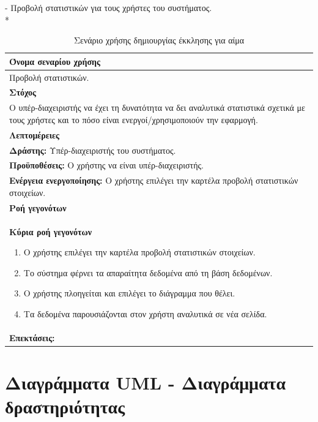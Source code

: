 \newpage
- Προβολή στατιστικών για τους χρήστες του συστήματος.
\\*		
\begin{table}[H]
	\begin{center}
	    \begin{tabular}{|p{\dimexpr \linewidth-2\tabcolsep}|}
	    \hline
	    \rowcolor{grayy}
	    \textbf{Όνομα σεναρίου χρήσης}
	    \\ \hline    
	    Προβολή στατιστικών.
	     \\ \hline
	    \rowcolor{grayy}
	    \textbf{\textbf{Στόχος}}
	    \\ \hline
	 	 Ο υπέρ-διαχειριστής να έχει τη δυνατότητα να δει αναλυτικά στατιστικά σχετικά με τους χρήστες και το πόσο είναι ενεργοί/χρησιμοποιούν την εφαρμογή. 
	    \\ \hline
	    \rowcolor{grayy}
	    \textbf{Λεπτομέρειες}
	    \\ \hline
		\textbf{Δράστης:} Υπέρ-διαχειριστής του συστήματος.
		\\*
		\textbf{Προϋποθέσεις:} Ο χρήστης να είναι υπέρ-διαχειριστής.
		\\*
		\textbf{Ενέργεια ενεργοποίησης:} Ο χρήστης επιλέγει την καρτέλα προβολή στατιστικών στοιχείων.
		\\ \hline
		\rowcolor{grayy}    
	    \textbf{Ροή γεγονότων}
	    \\ \hline
		\textbf{Κύρια ροή γεγονότων}
		\begin{enumerate}
		\item	 Ο χρήστης επιλέγει την καρτέλα προβολή στατιστικών στοιχείων.
		\item Το σύστημα φέρνει τα απαραίτητα δεδομένα από τη βάση δεδομένων.
		\item Ο χρήστης πλοηγείται και επιλέγει το διάγραμμα που θέλει.
		\item Τα δεδομένα παρουσιάζονται στον χρήστη αναλυτικά  σε νέα σελίδα.
		\end{enumerate}
		\\ \hline
		\rowcolor{grayy}
		\textbf{Επεκτάσεις:}
		   \\ \hline
	    \end{tabular}
	    \caption{Σενάριο χρήσης δημιουργίας έκκλησης για αίμα}
	    \label{tab:view_analytics} 
	\end{center}
\end{table}

\section{Διαγράμματα UML - Διαγράμματα δραστηριότητας}

